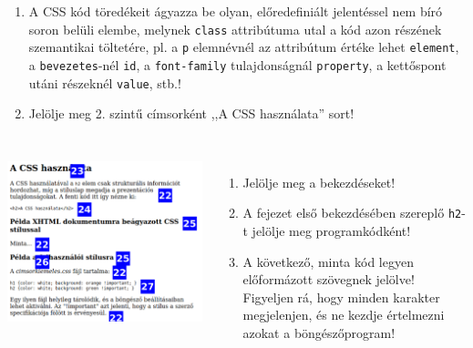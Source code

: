 \begin{frame}
\begin{columns}[c]
\begin{enumerate}
        \item A CSS kód töredékeit ágyazza be olyan, előredefiniált jelentéssel nem bíró soron belüli elembe, melynek \texttt{class} attribútuma utal a kód azon részének szemantikai töltetére, pl. a \texttt{p} elemnévnél az attribútum értéke lehet \texttt{element}, a \texttt{bevezetes}-nél \texttt{id}, a \texttt{font-family} tulajdonságnál \texttt{property}, a kettőspont utáni részeknél \texttt{value}, stb.!
        \item Jelölje meg 2. szintű címsorként ,,A CSS használata'' sort!
        \setcounter{feladatSzamlalo}{\theenumi}
      \end{enumerate}
  \end{columns}
\end{frame}

\begin{frame}
  \begin{columns}[c]
      \begin{exampleblock}{}
        \includegraphics[width=\textwidth]{css4.pdf}
      \end{exampleblock}
      \begin{enumerate}
        \setcounter{enumi}{\thefeladatSzamlalo}
        \item Jelölje meg a bekezdéseket!
        \item A fejezet első bekezdésében szereplő \texttt{h2}-t jelölje meg programkódként!
        \item A következő, minta kód legyen előformázott szövegnek jelölve! Figyeljen rá, hogy minden karakter megjelenjen, és ne kezdje értelmezni azokat a böngészőprogram!

\end{enumerate}
\end{columns}
\end{frame}
